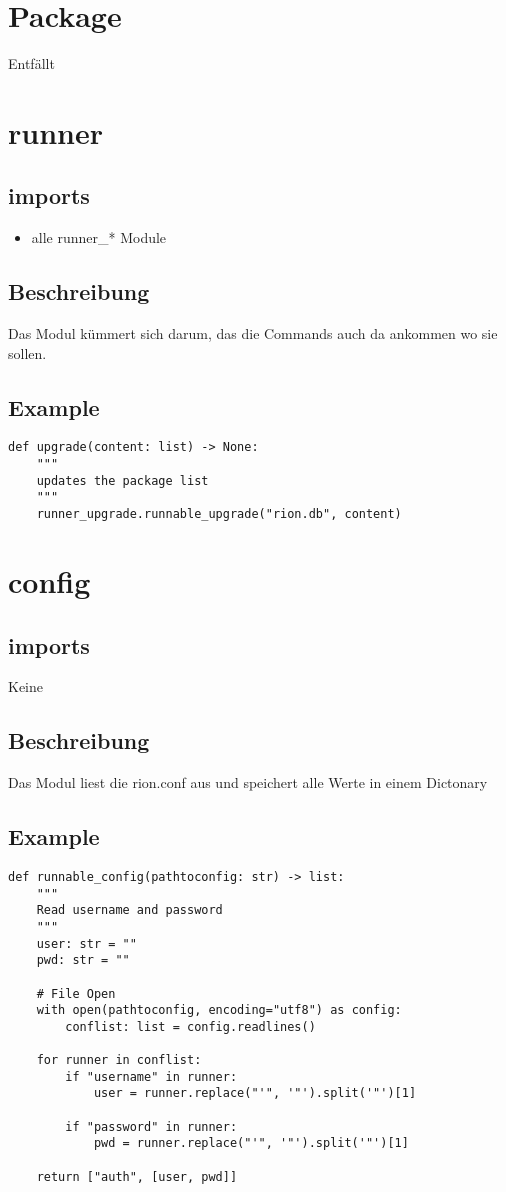 \documentclass[fleqn,10pt]{olplainarticle}
\begin{document}
\section{Package}
Entfällt

\section{runner}
\subsection{imports}
\begin{itemize}
    \item alle runner\_* Module
\end{itemize} 
\subsection{Beschreibung}
Das Modul kümmert sich darum, das die Commands auch da ankommen wo sie sollen.
\subsection{Example}
\begin{lstlisting}
def upgrade(content: list) -> None:
    """
    updates the package list
    """
    runner_upgrade.runnable_upgrade("rion.db", content)
\end{lstlisting}

\section{config}
\subsection{imports}
Keine
\subsection{Beschreibung}
Das Modul liest die rion.conf aus und speichert alle Werte in einem Dictonary
\subsection{Example}
\begin{lstlisting}
def runnable_config(pathtoconfig: str) -> list:
    """
    Read username and password
    """
    user: str = ""
    pwd: str = ""

    # File Open
    with open(pathtoconfig, encoding="utf8") as config:
        conflist: list = config.readlines()

    for runner in conflist:
        if "username" in runner:
            user = runner.replace("'", '"').split('"')[1]

        if "password" in runner:
            pwd = runner.replace("'", '"').split('"')[1]

    return ["auth", [user, pwd]]
\end{lstlisting}
\end{document}
